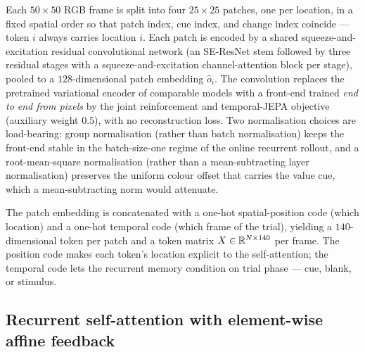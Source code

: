 Each $50\times50$ RGB frame is split into four $25\times25$ patches, one
per location, in a fixed spatial order so that patch index, cue index,
and change index coincide --- token $i$ always carries location $i$. Each
patch is encoded by a shared squeeze-and-excitation residual
convolutional network (an SE-ResNet stem followed by three residual
stages with a squeeze-and-excitation channel-attention block per stage),
pooled to a $128$-dimensional patch embedding $\hat{o}_i$. The
convolution replaces the pretrained variational encoder of comparable
models with a front-end trained \emph{end to end from pixels} by the
joint reinforcement and temporal-JEPA objective (auxiliary weight $0.5$), with no reconstruction
loss. Two normalisation choices are load-bearing: group
normalisation (rather than batch normalisation) keeps the front-end
stable in the batch-size-one regime of the online recurrent rollout, and
a root-mean-square normalisation (rather than a mean-subtracting layer
normalisation) preserves the uniform colour offset that carries the value
cue, which a mean-subtracting norm would attenuate.

The patch embedding is concatenated with a one-hot spatial-position code
(which location) and a one-hot temporal code (which frame of the trial),
yielding a $140$-dimensional token per patch and a token matrix
$X \in \mathbb{R}^{N \times 140}$ per frame. The position code makes
each token's location explicit to the self-attention; the temporal code
lets the recurrent memory condition on trial phase --- cue, blank, or
stimulus.

\subsection{Recurrent self-attention with element-wise affine feedback}
\label{sec:model-encoder}

